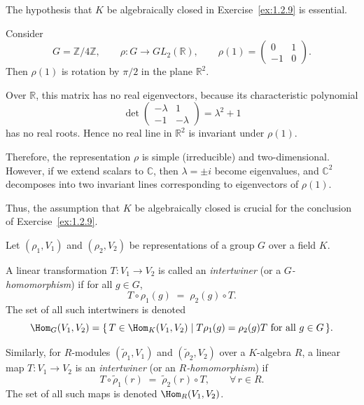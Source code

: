 \begin{example}\label{ex:R-rotation}
The hypothesis that $K$ be algebraically closed in Exercise~\ref{ex:1.2.9} is essential.

Consider
\[
G=\mathbb{Z}/4\mathbb{Z}, \qquad
\rho:G\longrightarrow GL_2(\mathbb{R}), \qquad
\rho(1)=
\begin{pmatrix}
0 & 1\\[2pt]
-1 & 0
\end{pmatrix}.
\]
Then $\rho(1)$ is rotation by $\pi/2$ in the plane $\mathbb{R}^2$.

\smallskip
\noindent
Over $\mathbb{R}$, this matrix has no real eigenvectors, because its characteristic polynomial
\[
\det
\begin{pmatrix}
-\lambda & 1\\[2pt]
-1 & -\lambda
\end{pmatrix}
=\lambda^2+1
\]
has no real roots. Hence no real line in $\mathbb{R}^2$ is invariant under $\rho(1)$.

\smallskip
\noindent
Therefore, the representation $\rho$ is simple (irreducible) and two-dimensional.
However, if we extend scalars to $\mathbb{C}$, then $\lambda=\pm i$ become eigenvalues, and
$\mathbb{C}^2$ decomposes into two invariant lines corresponding to eigenvectors of $\rho(1)$.

\smallskip
\noindent
Thus, the assumption that $K$ be algebraically closed is crucial for the conclusion of Exercise~\ref{ex:1.2.9}.
\end{example}

\begin{definition}\label{def:intertwiner}
Let $(\rho_1,V_1)$ and $(\rho_2,V_2)$ be representations of a group $G$ over a field $K$.

A linear transformation $T:V_1\to V_2$ is called an \emph{intertwiner} (or a \emph{$G$-homomorphism})
if for all $g\in G$,
\begin{equation}\label{eq:intertwiner-condition}
T\circ\rho_1(g) \;=\; \rho_2(g)\circ T.
\end{equation}
The set of all such intertwiners is denoted
\[
\Hom_G(V_1,V_2)
=\{\,T\in\Hom_K(V_1,V_2)\mid T\rho_1(g)=\rho_2(g)T\text{ for all }g\in G\,\}.
\]

\smallskip
\noindent
Similarly, for $R$-modules $(\tilde\rho_1,V_1)$ and $(\tilde\rho_2,V_2)$ over a $K$-algebra $R$,
a linear map $T:V_1\to V_2$ is an \emph{intertwiner} (or an \emph{$R$-homomorphism})
if
\[
T\circ\tilde\rho_1(r) \;=\; \tilde\rho_2(r)\circ T, \qquad \forall\, r\in R.
\]
The set of all such maps is denoted $\Hom_R(V_1,V_2)$.
\end{definition}


